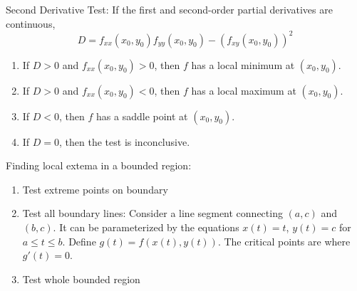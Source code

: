 \documentclass{article}
\begin{document}
Second Derivative Test: If the first and second-order partial derivatives are continuous,
\[D=f_{xx}(x_0,y_0)f_{yy}(x_0,y_0)-{(f_{xy}(x_0,y_0))}^2\]
\begin{enumerate}
    \item If $D>0$ and $f_{xx}(x_0,y_0)>0$, then $f$ has a local minimum at $(x_0,y_0)$.
    \item If $D>0$ and $f_{xx}(x_0,y_0)<0$, then $f$ has a local maximum at $(x_0,y_0)$.
    \item If $D<0$, then $f$ has a saddle point at $(x_0,y_0)$.
    \item If $D=0$, then the test is inconclusive.
\end{enumerate}

Finding local extema in a bounded region:
\begin{enumerate}
    \item Test extreme points on boundary
    \item Test all boundary lines: Consider a line segment connecting $(a,c)$ and $(b,c)$. It can be parameterized by the equations $x(t)=t$, $y(t)=c$ for $a\leq t\leq b$. Define $g(t)=f(x(t),y(t))$. The critical points are where $g'(t)=0$.
    \item Test whole bounded region
\end{enumerate}
\end{document}
